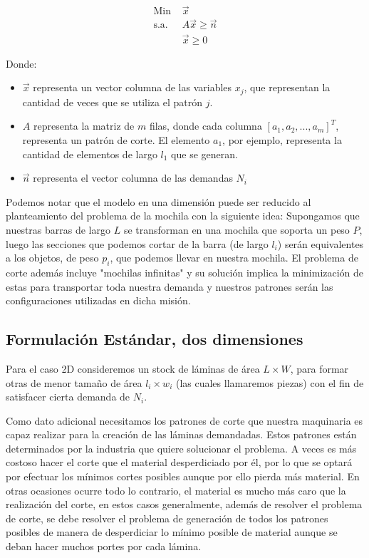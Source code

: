\documentclass[journal, 10pt]{IEEEtran}
\begin{document}
	\begin{align*}
		\text{Min  } &\vec{x}\\
		\text{s.a.  } &A\vec{x} \geq \vec{n}\\
			&\vec{x} \geq 0
	\end{align*}
	
	Donde:
	\begin{itemize}
		\item
			$\vec{x}$ representa un vector columna de las variables $x_j$, que
			representan la cantidad de veces que se utiliza el patrón $j$.
		\item 
			$A$ representa la matriz de $m$ filas, donde cada columna 
			$[a_1,a_2,...,a_m]^T$, representa un patrón de corte. El elemento
			$a_1$, por ejemplo, representa la cantidad de elementos de largo
			$l_1$ que se generan.
		\item
			$\vec{n}$ representa el vector columna de las demandas $N_i$
	\end{itemize}
	
	Podemos notar que el modelo en una dimensión puede ser reducido al
	planteamiento del problema de la mochila con la siguiente idea: Supongamos
	que nuestras barras de largo $L$ se transforman en una mochila que soporta
	un peso $P$, luego las secciones que podemos cortar de la barra (de largo
	$l_i$) serán equivalentes a los objetos, de peso $p_i$, que podemos llevar
	en nuestra mochila. El problema de corte además incluye "mochilas infinitas"
	y su solución implica la minimización de estas para transportar toda nuestra
	demanda y nuestros patrones serán las configuraciones utilizadas en dicha
	misión.
	
\subsection{Formulación Estándar, dos dimensiones}
	Para el caso 2D consideremos un stock de láminas de área $L \times W$,
	para formar otras de menor tamaño de área $l_i \times w_i$ (las cuales 
	llamaremos piezas) con el fin de satisfacer cierta demanda de $N_i$.
	
	Como dato adicional necesitamos los patrones de corte que nuestra maquinaria
	es capaz realizar para la creación de las láminas demandadas. Estos patrones 
	están determinados por la industria que quiere solucionar el problema. A
	veces es más costoso hacer el corte que el material desperdiciado por él,
	por lo que se optará por efectuar los mínimos cortes posibles aunque por
	ello pierda más material. En otras ocasiones ocurre todo lo contrario, el
	material es mucho más caro que la realización del corte, en estos casos
	generalmente, además de resolver el problema de corte, se debe resolver el
	problema de generación de todos los patrones posibles de manera de
	desperdiciar lo mínimo posible de material aunque se deban hacer muchos
	portes por cada lámina.
\end{document}
